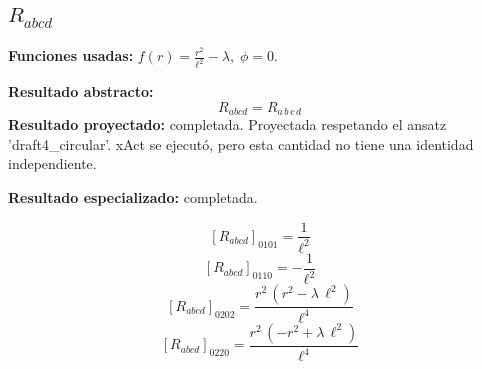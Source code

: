 \documentclass[11pt]{article}
\begin{document}
\subsection*{$ R_{abcd} $}
\textbf{Funciones usadas:} $ f\!\left(r\right) = \frac{{r}^{2}}{{\ell}^{2}} - \lambda,\;\phi=0 $.\par
\textbf{Resultado abstracto:}
\begin{dmath*}[breakdepth={5}]
R_{abcd} = R{}_{a\,b\,c\,d}
\end{dmath*}
\textbf{Resultado proyectado:} completada. Proyectada respetando el ansatz 'draft4\_circular'. xAct se ejecutó, pero esta cantidad no tiene una identidad independiente.\par
\textbf{Resultado especializado:} completada.\par
\begin{dmath*}[breakdepth={5}]
\left[R_{abcd}\right]_{0101} = \frac{1}{{\ell}^{2}}
\end{dmath*}
\begin{dmath*}[breakdepth={5}]
\left[R_{abcd}\right]_{0110} = -\frac{1}{{\ell}^{2}}
\end{dmath*}
\begin{dmath*}[breakdepth={5}]
\left[R_{abcd}\right]_{0202} = \frac{{r}^{2}\,\left({r}^{2} - \lambda\,{\ell}^{2}\right)}{{\ell}^{4}}
\end{dmath*}
\begin{dmath*}[breakdepth={5}]
\left[R_{abcd}\right]_{0220} = \frac{{r}^{2}\,\left(-{r}^{2} + \lambda\,{\ell}^{2}\right)}{{\ell}^{4}}
\end{dmath*}
\end{document}
